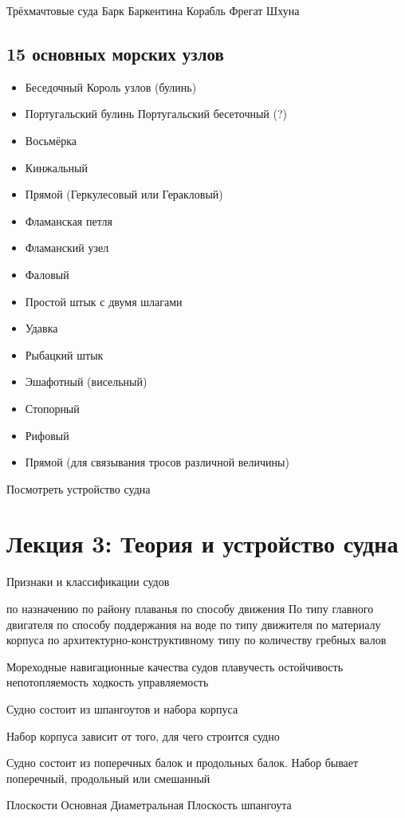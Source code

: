 \documentclass{article}        %
\begin{document}
\begin{description}
Трёхмачтовые суда
Барк
Баркентина
Корабль
Фрегат
Шхуна

\subsection{15 основных морских узлов}
\begin{itemize}
	\item Беседочный Король узлов (булинь)
	\item Португальский булинь  Португальский бесеточный (?) 
	\item Восьмёрка
	\item Кинжальный
	\item Прямой (Геркулесовый или Геракловый)
	\item Фламанская петля
	\item Фламанский узел
	\item Фаловый
	\item Простой штык с двумя шлагами
	\item Удавка
	\item Рыбацкий штык
	\item Эшафотный (висельный)
	\item Стопорный
	\item Рифовый
	\item Прямой (для связывания тросов различной величины)
\end{itemize}
Посмотреть устройство судна

\section{Лекция 3: Теория и устройство судна}
Признаки и классификации судов

по назначению
по району плаванья
по способу движения
По типу главного двигателя
по способу поддержания на воде
по типу движителя
по материалу корпуса
по архитектурно-конструктивному типу
по количеству гребных валов

Мореходные навигационные качества судов
плавучесть
остойчивость
непотопляемость
ходкость
управляемость


Судно состоит из шпангоутов и набора корпуса

Набор корпуса зависит от того, для чего строится судно

Судно состоит из поперечных балок и продольных балок. Набор бывает поперечный, продольный или смешанный

Плоскости
Основная
Диаметральная
Плоскость шпангоута


\end{description}
\end{document}

